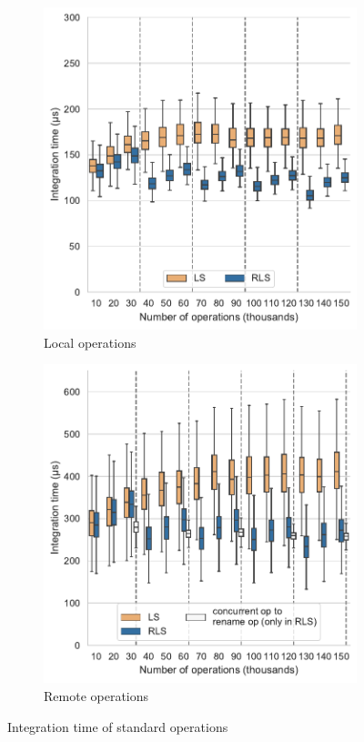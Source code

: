 \documentclass[sigplan,10pt,authorversion]{acmart}
\begin{document}
\begin{figure}[ht!]
    \begin{subfigure}{\columnwidth}
        \centering
        \includegraphics[width=0.9\columnwidth]{img/integration-time-boxplot-local-operations-without-outliers.pdf}
        \caption{Local operations}
        \label{fig:evolution-integration-time-local-insert-remove}
    \end{subfigure}
    \begin{subfigure}{\columnwidth}
        \centering
        \includegraphics[width=0.9\columnwidth]{img/integration-time-boxplot-remote-operations-without-outliers.pdf}
        \caption{Remote operations}
        \label{fig:evolution-integration-time-remote-insert-remove}
    \end{subfigure}
    \caption{Integration time of standard operations}
    \label{fig:evolution-integration-time-insert-remove}
\end{figure}
\end{document}
